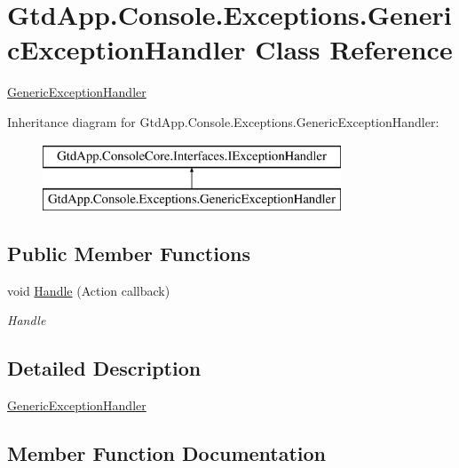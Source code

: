 \hypertarget{class_gtd_app_1_1_console_1_1_exceptions_1_1_generic_exception_handler}{}\section{Gtd\+App.\+Console.\+Exceptions.\+Generic\+Exception\+Handler Class Reference}
\label{class_gtd_app_1_1_console_1_1_exceptions_1_1_generic_exception_handler}


\mbox{\hyperlink{class_gtd_app_1_1_console_1_1_exceptions_1_1_generic_exception_handler}{Generic\+Exception\+Handler}}  


Inheritance diagram for Gtd\+App.\+Console.\+Exceptions.\+Generic\+Exception\+Handler\+:\begin{figure}[H]
\begin{center}
\leavevmode
\includegraphics[height=2.000000cm]{class_gtd_app_1_1_console_1_1_exceptions_1_1_generic_exception_handler}
\end{center}
\end{figure}
\subsection*{Public Member Functions}
\begin{DoxyCompactItemize}
\item 
void \mbox{\hyperlink{class_gtd_app_1_1_console_1_1_exceptions_1_1_generic_exception_handler_ad27db6275cb1cd84431622f1f941173a}{Handle}} (Action callback)
\begin{DoxyCompactList}\small\item\em Handle \end{DoxyCompactList}\end{DoxyCompactItemize}


\subsection{Detailed Description}
\mbox{\hyperlink{class_gtd_app_1_1_console_1_1_exceptions_1_1_generic_exception_handler}{Generic\+Exception\+Handler}} 



\subsection{Member Function Documentation}
\mbox{\label{class_gtd_app_1_1_console_1_1_exceptions_1_1_generic_exception_handler_ad27db6275cb1cd84431622f1f941173a}} 
